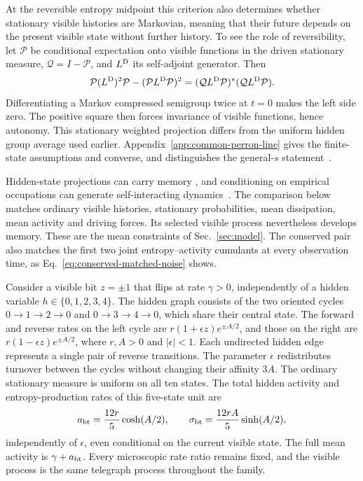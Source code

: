 \documentclass[aps,pre,reprint,amsmath,amssymb,longbibliography,floatfix]{revtex4-2}
\begin{document}
At the reversible entropy midpoint this criterion also determines
whether stationary visible histories are Markovian, meaning that their
future depends on the present visible state without further history.
To see the role of reversibility, let $\mathcal P$ be conditional
expectation onto visible functions in the driven stationary measure,
$\mathcal Q=I-\mathcal P$, and $L^{\rm D}$ its self-adjoint generator.
Then
\begin{equation}
 \mathcal P(L^{\rm D})^2\mathcal P-(\mathcal P L^{\rm D}\mathcal P)^2
 = (\mathcal QL^{\rm D}\mathcal P)^*(\mathcal QL^{\rm D}\mathcal P).
 \label{eq:common-line-compression-main}
\end{equation}
Differentiating a Markov compressed semigroup twice at $t=0$ makes
the left side zero. The positive square then forces invariance of visible functions, hence autonomy.
This stationary weighted projection differs from the uniform hidden
group average used earlier. Appendix~\ref{app:common-perron-line}
gives the finite-state assumptions and converse, and distinguishes
the general-$s$ statement~\cite{BurkeRosenblatt1958}.

Hidden-state projections can carry memory
\cite{RoldanParrondo2012}, and conditioning on empirical occupations can
generate self-interacting dynamics~\cite{CoghiGarrahan2025}.
The comparison below matches ordinary visible histories, stationary
probabilities, mean dissipation, mean activity and driving forces.
Its selected visible process nevertheless develops memory. These are
the mean constraints of Sec.~\ref{sec:model}. The conserved pair also
matches the first two joint entropy--activity cumulants at every
observation time, as Eq.~\eqref{eq:conserved-matched-noise} shows.

Consider a visible bit $z=\pm1$ that flips at rate $\gamma>0$,
independently of a hidden variable $h\in\{0,1,2,3,4\}$.
The hidden graph consists of the two oriented cycles
$0\to1\to2\to0$ and $0\to3\to4\to0$, which share their central state.
The forward and reverse rates on the left cycle are
$r(1+\epsilon z)e^{\pm A/2}$, and those on the right are
$r(1-\epsilon z)e^{\pm A/2}$, where $r,A>0$ and $|\epsilon|<1$.
Each undirected hidden edge represents a single pair of reverse
transitions. The parameter $\epsilon$ redistributes turnover between
the cycles without changing their affinity $3A$.
The ordinary stationary measure is uniform on all ten states. The total
hidden activity and entropy-production rates of this five-state unit are
\begin{equation}
 a_{\rm bt}=\frac{12r}{5}\cosh(A/2),\qquad
 \sigma_{\rm bt}=\frac{12rA}{5}\sinh(A/2),
 \label{eq:memory-matched-means}
\end{equation}
independently of $\epsilon$, even conditional on the current visible
state. The full mean activity is $\gamma+a_{\rm bt}$. Every microscopic
rate ratio remains fixed, and the visible process is the same telegraph
process throughout the family.
\end{document}

